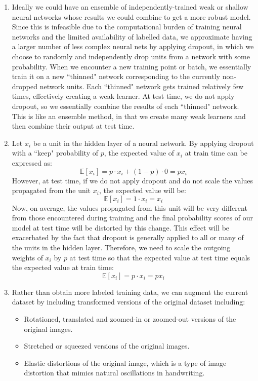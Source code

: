 \documentclass[a4paper]{article}
\begin{document}
\begin{enumerate}
\item{ Ideally we could have an ensemble of independently-trained weak or shallow neural networks whose results we could combine to get a more robust model. Since this is infeasible due to the computational burden of training neural networks and the limited availability of labelled data, we approximate having a larger number of less complex neural nets by applying dropout, in which we choose to randomly and independently drop units from a network with some probability. When we encounter a new training point or batch, we essentially train it on a new ``thinned" network corresponding to the currently non-dropped network units. Each ``thinned" network gets trained relatively few times, effectively creating a weak learner. At test time, we do not apply dropout, so we essentially combine the results of each ``thinned" network. This is like an ensemble method, in that we create many weak learners and then combine their output at test time. 

 }
\item{Let $x_i$ be a unit in the hidden layer of a neural network. By applying dropout with a ``keep" probability of $p$, the expected value of $x_i$ at train time can be expressed as:
$$\mathbb{E}[x_i] = p \cdot x_i + (1-p) \cdot 0 = p x_i   $$
However, at test time, if we do not apply dropout and do not scale the values propagated from the unit $x_i$, the expected value will be:
$$\mathbb{E}[x_i] = 1 \cdot x_i = x_i   $$
Now, on average, the values propagated from this unit will be very different from those encountered during training and the final probability scores of our model at test time will be distorted by this change. This effect will be exacerbated by the fact that dropout is generally applied to all or many of the units in the hidden layer. Therefore, we need to scale the outgoing weights of $x_i$ by $p$ at test time so that the expected value at test time equals the expected value at train time:
$$\mathbb{E}[x_i] = p \cdot x_i = p x_i   $$

}
\item{Rather than obtain more labeled training data, we can augment the current dataset by including transformed versions of the original dataset including: 
\begin{itemize}
\item{Rotationed, translated and zoomed-in or zoomed-out versions of the original images.}
\item{Stretched or squeezed versions of the original images.}
\item{Elastic distortions of the original image, which is a type of image distortion that mimics natural oscillations in handwriting.}
\end{itemize}

}
\end{enumerate}
\end{document}
